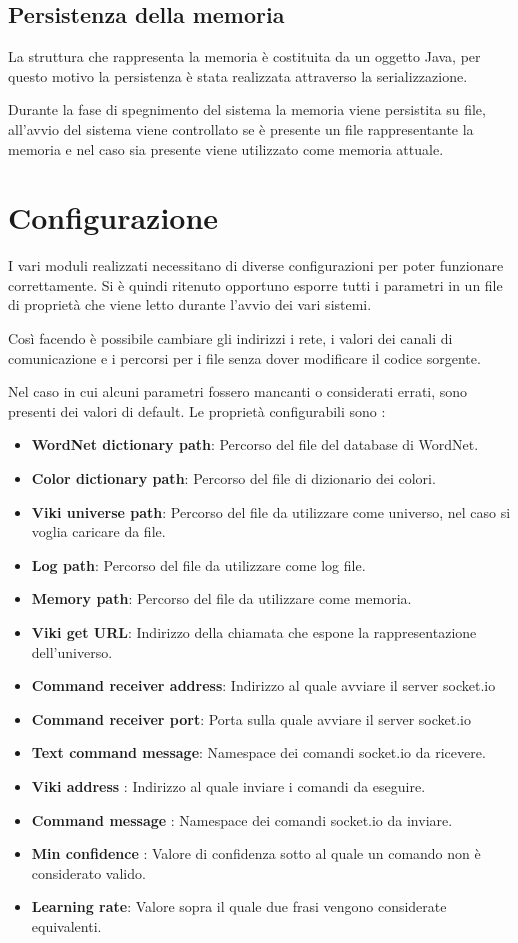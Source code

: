 \documentclass[twoside]{supsistudent}
\begin{document}
\section{Persistenza della memoria}
La struttura che rappresenta la memoria è costituita da un oggetto Java, per questo motivo la persistenza è stata realizzata attraverso la serializzazione.

Durante la fase di spegnimento del sistema la memoria viene persistita su file, all'avvio del sistema viene controllato se è presente un file rappresentante la memoria e nel caso sia presente viene utilizzato come memoria attuale.

\chapter{Configurazione}
I vari moduli realizzati necessitano di diverse configurazioni per poter funzionare correttamente. Si è quindi ritenuto opportuno esporre tutti i parametri in un file di proprietà che viene letto durante l'avvio dei vari sistemi. 

Così facendo è possibile cambiare gli indirizzi i rete, i valori dei canali di comunicazione e i percorsi per i file senza dover modificare il codice sorgente.

Nel caso in cui alcuni parametri fossero mancanti o considerati errati, sono presenti dei valori di default.
Le proprietà configurabili sono :
\begin{itemize}

  \item \textbf{WordNet dictionary path}: Percorso del file del database di WordNet.
   \item \textbf{Color dictionary path}: Percorso del file di dizionario dei colori.
      \item \textbf{Viki universe path}: Percorso del file da utilizzare come universo, nel caso si voglia caricare da file.
      \item \textbf{Log path}: Percorso del file da utilizzare come log file.
      \item \textbf{Memory path}: Percorso del file da utilizzare come memoria.
      \item \textbf{Viki get URL}: Indirizzo della chiamata che espone la rappresentazione dell'universo.
      \item \textbf{Command receiver address}: Indirizzo al quale avviare il server socket.io
      \item \textbf{Command receiver port}: Porta sulla quale avviare il server socket.io
      \item \textbf{Text command message}: Namespace dei comandi socket.io da ricevere.
      \item \textbf{Viki address }: Indirizzo al quale inviare i comandi da eseguire.
      \item \textbf{Command message }: Namespace dei comandi socket.io da inviare.
      \item \textbf{Min confidence }: Valore di confidenza sotto al quale un comando non è considerato valido.
      \item \textbf{Learning rate}: Valore sopra il quale due frasi vengono considerate equivalenti.
\end{itemize}
\end{document}
